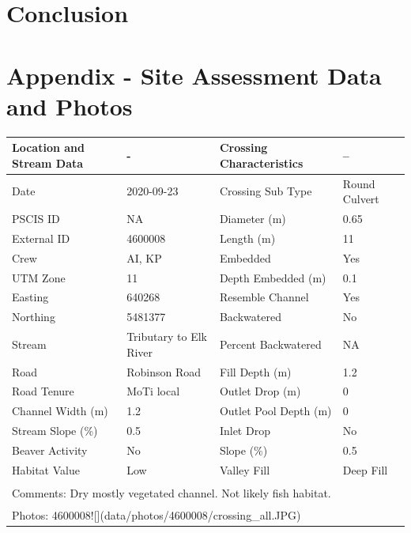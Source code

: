 \documentclass[
]{book}
\begin{document}
\hypertarget{conclusion}{%
\chapter{Conclusion}\label{conclusion}}

\hypertarget{appendix---site-assessment-data-and-photos}{%
\chapter*{Appendix - Site Assessment Data and Photos}\label{appendix---site-assessment-data-and-photos}}

\begin{tabular}{llll}
\toprule
Location and Stream Data & - & Crossing Characteristics & --\\
\midrule
Date & 2020-09-23 & Crossing Sub Type & Round Culvert\\
PSCIS ID & NA & Diameter (m) & 0.65\\
External ID & 4600008 & Length (m) & 11\\
Crew & AI, KP & Embedded & Yes\\
UTM Zone & 11 & Depth Embedded (m) & 0.1\\
\addlinespace
Easting & 640268 & Resemble Channel & Yes\\
Northing & 5481377 & Backwatered & No\\
Stream & Tributary to Elk River & Percent Backwatered & NA\\
Road & Robinson Road & Fill Depth (m) & 1.2\\
Road Tenure & MoTi local & Outlet Drop (m) & 0\\
\addlinespace
Channel Width (m) & 1.2 & Outlet Pool Depth (m) & 0\\
Stream Slope (\%) & 0.5 & Inlet Drop & No\\
Beaver Activity & No & Slope (\%) & 0.5\\
Habitat Value & Low & Valley Fill & Deep Fill\\
\bottomrule
\multicolumn{4}{l}{\textsuperscript{} Comments: Dry mostly vegetated channel. Not likely fish habitat.}\\
\multicolumn{4}{l}{\textsuperscript{} Photos: 4600008![](data/photos/4600008/crossing\_all.JPG)}\\
\end{tabular}
\end{document}
